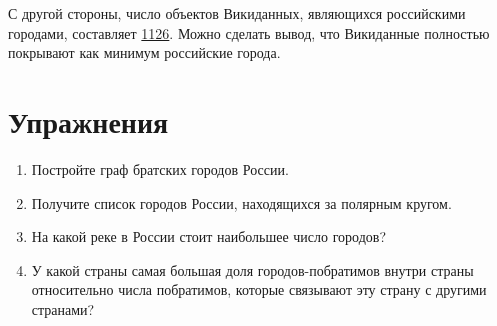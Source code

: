 С другой стороны, число объектов Викиданных, являющихся российскими городами, 
составляет \href{https://w.wiki/jyP}{\num{1126}}. 
Можно сделать вывод, что Викиданные полностью покрывают как минимум российские города. 

\section{Упражнения}

\begin{enumerate}
\item Постройте граф братских городов России.
\item Получите список городов России, находящихся за полярным кругом.
\item На какой реке в России стоит наибольшее число городов?
\item У какой страны самая большая доля городов-побратимов внутри страны относительно числа побратимов, которые связывают эту страну с другими странами?
\end{enumerate}
